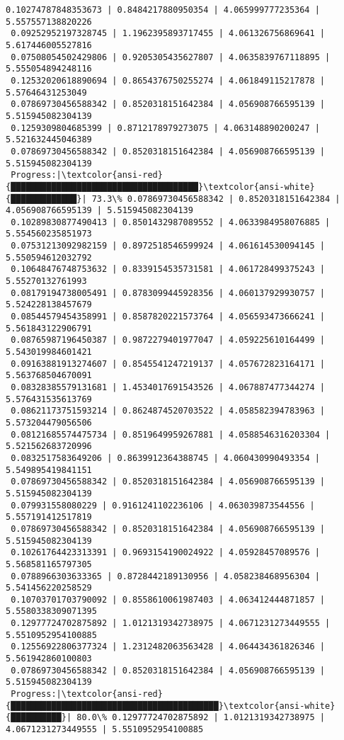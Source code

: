\documentclass[11pt]{article}
\begin{document}
\begin{Verbatim}[commandchars=\\\{\}]
 0.10274787848353673 | 0.8484217880950354 | 4.065999777235364 | 5.557557138820226
 0.09252952197328745 | 1.1962395893717455 | 4.061326756869641 | 5.617446005527816
 0.07508054502429806 | 0.9205305435627807 | 4.0635839767118895 | 5.555054894248116
 0.12532020618890694 | 0.8654376750255274 | 4.061849115217878 | 5.57646431253049
 0.07869730456588342 | 0.8520318151642384 | 4.056908766595139 | 5.515945082304139
 0.1259309804685399 | 0.8712178979273075 | 4.063148890200247 | 5.521632445046389
 0.07869730456588342 | 0.8520318151642384 | 4.056908766595139 | 5.515945082304139
 Progress:|\textcolor{ansi-red}{█████████████████████████████████████}\textcolor{ansi-white}{█████████████}| 73.3\% 0.07869730456588342 | 0.8520318151642384 | 4.056908766595139 | 5.515945082304139
 0.10289830877490413 | 0.8501432987089552 | 4.0633984958076885 | 5.554560235851973
 0.07531213092982159 | 0.8972518546599924 | 4.061614530094145 | 5.550594612032792
 0.10648476748753632 | 0.8339154535731581 | 4.061728499375243 | 5.55270132761993
 0.08179194738005491 | 0.8783099445928356 | 4.060137929930757 | 5.524228138457679
 0.08544579454358991 | 0.8587820221573764 | 4.056593473666241 | 5.561843122906791
 0.08765987196450387 | 0.9872279401977047 | 4.059225610164499 | 5.543019984601421
 0.09163881913274607 | 0.8545541247219137 | 4.057672823164171 | 5.563768504670091
 0.08328385579131681 | 1.4534017691543526 | 4.067887477344274 | 5.576431535613769
 0.08621173751593214 | 0.8624874520703522 | 4.058582394783963 | 5.573204479056506
 0.08121685574475734 | 0.8519649959267881 | 4.0588546316203304 | 5.521562683720996
 0.0832517583649206 | 0.8639912364388745 | 4.060430990493354 | 5.549895419841151
 0.07869730456588342 | 0.8520318151642384 | 4.056908766595139 | 5.515945082304139
 0.079931558080229 | 0.9161241102236106 | 4.063039873544556 | 5.557191412517819
 0.07869730456588342 | 0.8520318151642384 | 4.056908766595139 | 5.515945082304139
 0.10261764423313391 | 0.9693154190024922 | 4.05928457089576 | 5.568581165797305
 0.0788966303633365 | 0.8728442189130956 | 4.058238468956304 | 5.541456220258529
 0.10703701703790092 | 0.8558610061987403 | 4.063412444871857 | 5.5580338309071395
 0.12977724702875892 | 1.0121319342738975 | 4.0671231273449555 | 5.5510952954100885
 0.12556922806377324 | 1.2312482063563428 | 4.064434361826346 | 5.561942860100803
 0.07869730456588342 | 0.8520318151642384 | 4.056908766595139 | 5.515945082304139
 Progress:|\textcolor{ansi-red}{█████████████████████████████████████████}\textcolor{ansi-white}{██████████}| 80.0\% 0.12977724702875892 | 1.0121319342738975 | 4.0671231273449555 | 5.5510952954100885

\end{Verbatim}
\end{document}
